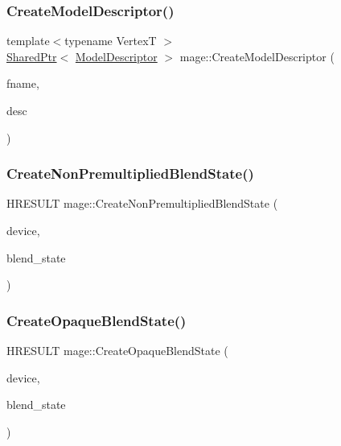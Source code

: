 \hypertarget{namespacemage_a8cc26f80d3cb6f3d457bb06942880d84}{}\label{namespacemage_a8cc26f80d3cb6f3d457bb06942880d84} 
\subsubsection{\texorpdfstring{Create\+Model\+Descriptor()}{CreateModelDescriptor()}}
{\footnotesize\ttfamily template$<$typename VertexT $>$ \\
\hyperlink{namespacemage_a1e01ae66713838a7a67d30e44c67703e}{Shared\+Ptr}$<$ \hyperlink{classmage_1_1_model_descriptor}{Model\+Descriptor} $>$ mage\+::\+Create\+Model\+Descriptor (\begin{DoxyParamCaption}\item[{const wstring \&}]{fname,  }\item[{const \hyperlink{structmage_1_1_mesh_descriptor}{Mesh\+Descriptor}$<$ VertexT $>$ \&}]{desc }\end{DoxyParamCaption})}

\hypertarget{namespacemage_a6f4e37e4b8092acec9dad9a8b24ebb07}{}\label{namespacemage_a6f4e37e4b8092acec9dad9a8b24ebb07} 
\subsubsection{\texorpdfstring{Create\+Non\+Premultiplied\+Blend\+State()}{CreateNonPremultipliedBlendState()}}
{\footnotesize\ttfamily H\+R\+E\+S\+U\+LT mage\+::\+Create\+Non\+Premultiplied\+Blend\+State (\begin{DoxyParamCaption}\item[{I\+D3\+D11\+Device2 $\ast$}]{device,  }\item[{I\+D3\+D11\+Blend\+State $\ast$$\ast$}]{blend\+\_\+state }\end{DoxyParamCaption})}

\hypertarget{namespacemage_ab2f30a0ab5f75edd279091ee24bc7811}{}\label{namespacemage_ab2f30a0ab5f75edd279091ee24bc7811} 
\subsubsection{\texorpdfstring{Create\+Opaque\+Blend\+State()}{CreateOpaqueBlendState()}}
{\footnotesize\ttfamily H\+R\+E\+S\+U\+LT mage\+::\+Create\+Opaque\+Blend\+State (\begin{DoxyParamCaption}\item[{I\+D3\+D11\+Device2 $\ast$}]{device,  }\item[{I\+D3\+D11\+Blend\+State $\ast$$\ast$}]{blend\+\_\+state }\end{DoxyParamCaption})}

